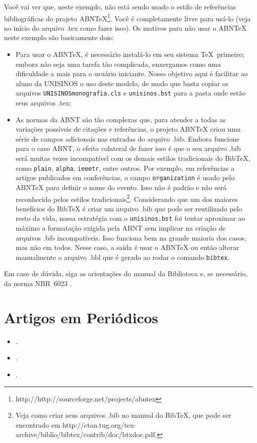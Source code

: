 \documentclass[twoside,english,brazilian]{UNISINOSmonografia}
\begin{document}
Você vai ver que, neste exemplo, não está sendo usado o estilo de referências bibliográficas do projeto ABNTeX\footnote{http://http://sourceforge.net/projects/abntex}.  Você é completamente livre para usá-lo (veja no início do arquivo .tex como fazer isso).  Os motivos para não usar o ABNTeX neste exemplo são basicamente dois:
\begin{itemize}
	\item Para usar o ABNTeX, é necessário instalá-lo em seu sistema \TeX\ primeiro; embora não seja uma tarefa tão complicada, enxergamos como uma dificuldade a mais para o usuário iniciante.  Nosso objetivo aqui é facilitar ao aluno da UNISINOS o uso deste modelo, de modo que basta copiar os arquivos \texttt{UNISINOSmonografia.cls} e \texttt{unisinos.bst} para a pasta onde estão seus arquivos .tex;
	\item As normas da ABNT são tão complexas que, para atender a todas as variações possíveis de citações e referências, o projeto ABNTeX criou uma série de campos adicionais nas entradas do arquivo .bib.  Embora funcione para o caso ABNT, o efeito colateral de fazer isso é que o seu arquivo .bib será muitas vezes incompatível com os demais estilos tradicionais do BibTeX, como \texttt{plain}, \texttt{alpha}, \texttt{ieeetr}, entre outros.  Por exemplo, em referências a artigos publicados em conferências, o campo \texttt{organization} é usado pelo ABNTeX para definir o nome do evento.  Isso não é padrão e não será reconhecido pelos estilos tradicionais\footnote{Veja como criar seus arquivos .bib no manual do BibTeX, que pode ser encontrado em http://ctan.tug.org/tex-archive/biblio/bibtex/contrib/doc/btxdoc.pdf.}.  Considerando que um dos maiores benefícios do BibTeX é criar um arquivo .bib que pode ser reutilizado pelo resto da vida, nossa estratégia com o \texttt{unisinos.bst} foi tentar aproximar ao máximo a formatação exigida pela ABNT sem implicar na criação de arquivos .bib incompatíveis.  Isso funciona bem na grande maioria dos casos, mas não em todos.  Nesse caso, a saída é usar o ABNTeX ou então alterar manualmente o arquivo .bbl que é gerado ao rodar o comando \texttt{bibtex}.
\end{itemize}

Em caso de dúvida, siga as orientações do manual da Biblioteca \cite{Biblioteca11} e, se necessário, da norma NBR~6023 \cite{NBR6023:2002}.

\section{Artigos em Periódicos}
\begin{itemize}
	\item {}.
	\item {}.
	\item {}.
\end{itemize}
\end{document}
